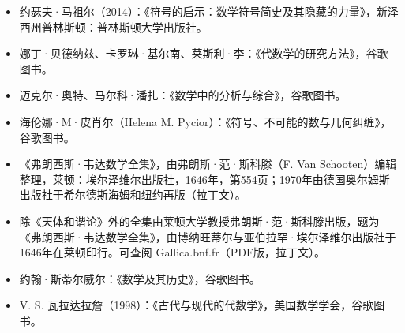 \begin{itemize}
\item 约瑟夫·马祖尔（2014）：《符号的启示：数学符号简史及其隐藏的力量》，新泽西州普林斯顿：普林斯顿大学出版社。
\item 娜丁·贝德纳兹、卡罗琳·基尔南、莱斯利·李：《代数学的研究方法》，谷歌图书。
\item 迈克尔·奥特、马尔科·潘扎：《数学中的分析与综合》，谷歌图书。
\item 海伦娜·M·皮肖尔（Helena M. Pycior）：《符号、不可能的数与几何纠缠》，谷歌图书。
\item 《弗朗西斯·韦达数学全集》，由弗朗斯·范·斯科滕（F. Van Schooten）编辑整理，莱顿：埃尔泽维尔出版社，1646年，第554页；1970年由德国奥尔姆斯出版社于希尔德斯海姆和纽约再版（拉丁文）。
\item 除《天体和谐论》外的全集由莱顿大学教授弗朗斯·范·斯科滕出版，题为《弗朗西斯·韦达数学全集》，由博纳旺蒂尔与亚伯拉罕·埃尔泽维尔出版社于1646年在莱顿印行。可查阅 Gallica.bnf.fr（PDF版，拉丁文）。
\item 约翰·斯蒂尔威尔：《数学及其历史》，谷歌图书。
\item V. S. 瓦拉达拉詹（1998）：《古代与现代的代数学》，美国数学学会，谷歌图书。

\end{itemize}